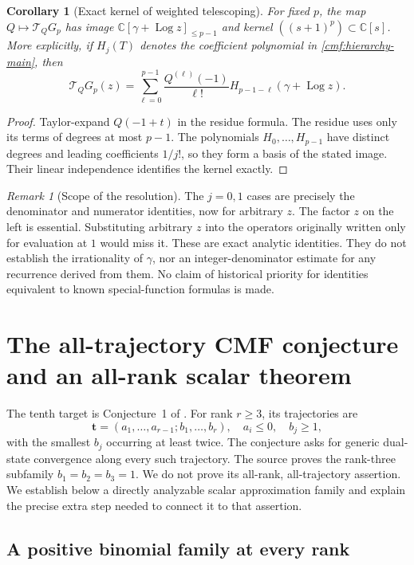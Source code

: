 \documentclass[11pt,a4paper]{article}
\numberwithin{equation}{section}
\newtheorem{corollary}[theorem]{Corollary}
\theoremstyle{definition}
\theoremstyle{remark}
\newtheorem{remark}[theorem]{Remark}
\DeclareMathOperator{\Log}{Log}
\begin{document}
\begin{corollary}[Exact kernel of weighted telescoping]
\label{cmf:kernel}
For fixed $p$, the map $Q\mapsto\mathcal T_QG_p$ has image
$\mathbb C[\gamma+\Log z]_{\le p-1}$ and kernel
$((s+1)^p)\subset\mathbb C[s]$. More explicitly, if $H_j(T)$
denotes the coefficient polynomial in
\eqref{cmf:hierarchy-main}, then
\[
 \mathcal T_QG_p(z)=
 \sum_{\ell=0}^{p-1}\frac{Q^{(\ell)}(-1)}{\ell!}
 H_{p-1-\ell}(\gamma+\Log z).
\]
\end{corollary}
\begin{proof}
Taylor-expand $Q(-1+t)$ in the residue formula. The residue uses
only its terms of degrees at most $p-1$. The polynomials
$H_0,\ldots,H_{p-1}$ have distinct degrees and leading
coefficients $1/j!$, so they form a basis of the stated image.
Their linear independence identifies the kernel exactly.
\end{proof}

\begin{remark}[Scope of the resolution]
The $j=0,1$ cases are precisely the denominator and numerator
identities, now for arbitrary $z$. The factor $z$ on the left is
essential. Substituting arbitrary $z$ into the operators originally
written only for evaluation at $1$ would miss it. These are exact
analytic identities. They do not establish the irrationality of
$\gamma$, nor an integer-denominator estimate for any recurrence
derived from them. No claim of historical priority for identities
equivalent to known special-function formulas is made.
\end{remark}


\section{The all-trajectory CMF conjecture and an all-rank scalar theorem}
\label{cmf:convergence}

The tenth target is Conjecture~1 of \cite{CMF2026}. For rank
$r\ge3$, its trajectories are
\[
 \mathbf t=(a_1,\ldots,a_{r-1};b_1,\ldots,b_r),\quad
 a_i\le0,\quad b_j\ge1,
\]
with the smallest $b_j$ occurring at least twice. The conjecture
asks for generic dual-state convergence along every such trajectory.
The source proves the rank-three subfamily $b_1=b_2=b_3=1$.
We do not prove its all-rank, all-trajectory assertion. We establish
below a directly analyzable scalar approximation family and explain
the precise extra step needed to connect it to that assertion.

\subsection{A positive binomial family at every rank}
\end{document}
